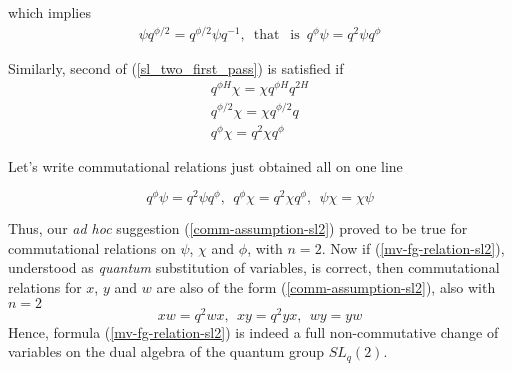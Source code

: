 \documentclass{article}
\newcommand{\lsb}{\left [}
\newcommand{\rsb}{\right ]}
\newcommand{\be}{\begin{eqnarray}}
\newcommand{\ee}{\end{eqnarray}}
\DeclareMathOperator{\that}{that}
\DeclareMathOperator{\is}{is}
\newcommand {\?}{\textit{???}}
\newcommand{\delabel}[1]{(\ref{#1})}
\begin{document}
which implies
\be
\psi q^{\phi/2} = q^{\phi/2} \psi q^{-1},\ \that\ \is\ q^\phi \psi = q^2 \psi q^\phi
\ee

Similarly, second of (\ref{sl_two_first_pass}) is satisfied if
\be
q^{\phi H} \chi = \chi q^{\phi H} q^{2H} \\ q^{\phi/2} \chi = \chi q^{\phi/2} q \nonumber \\ q^\phi \chi = q^2 \chi q^\phi \nonumber
\ee

Let's write commutational relations just obtained all on one line

\begin{equation}
\label{comm-relations-psichiphi-sl2}
\boxed{
q^\phi \psi = q^2 \psi q^\phi,\ \ q^\phi \chi = q^2 \chi q^\phi,\ \ \psi \chi = \chi \psi
}
\end{equation}

Thus, our {\it ad hoc} suggestion \delabel{comm-assumption-sl2} proved to be true for commutational
relations on $\psi$, $\chi$ and $\phi$, with $n = 2$.
Now if \delabel{mv-fg-relation-sl2}, understood as {\it quantum} substitution of variables, is correct,
then commutational relations for $x$, $y$ and $w$ are also of the form \delabel{comm-assumption-sl2},
also with $n = 2$
\begin{equation}
\label{comm-relations-wxy-sl2}
\boxed{
x w = q^2 w x,\ \ x y = q^2 y x,\ \ w y = y w
}
\end{equation}
Hence, formula \delabel{mv-fg-relation-sl2} is indeed a full non-commutative change of variables on the
dual algebra of the quantum group $SL_q(2)$.




\end{document}
